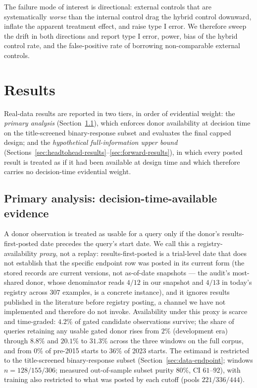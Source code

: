\documentclass[11pt]{article}
\begin{document}
The failure mode of interest is directional: external controls that are
systematically \emph{worse} than the internal control drag the hybrid control
downward, inflate the apparent treatment effect, and raise type I error. We
therefore sweep the drift in both directions and report type I error, power,
bias of the hybrid control rate, and the false-positive rate of borrowing
non-comparable external controls.

\section{Results}
\label{sec:results}

Real-data results are reported in two tiers, in order of evidential weight:
the \emph{primary analysis} (Section~\ref{sec:primary-results}), which
enforces donor availability at decision time on the title-screened binary-response
subset and evaluates the final capped design; and the \emph{hypothetical
full-information upper bound}
(Sections~\ref{sec:headtohead-results}--\ref{sec:forward-results}), in which
every posted result is treated as if it had been available at design time
and which therefore carries no decision-time evidential weight.

\subsection{Primary analysis: decision-time-available evidence}
\label{sec:primary-results}

A donor observation is treated as usable for a query only if the
donor's results-first-posted date precedes the query's start date. We call
this a registry-availability \emph{proxy}, not a replay: results-first-posted
is a trial-level date that does not establish that the specific endpoint row
was posted in its current form (the stored records are current versions, not
as-of-date snapshots --- the audit's most-shared donor, whose denominator
reads $4/12$ in our snapshot and $4/13$ in today's registry across $307$
examples, is a concrete instance), and it ignores results published in the
literature before registry posting, a channel we have not implemented and
therefore do not invoke. Availability under this proxy is scarce and
time-graded: $4.2\%$ of gated candidate observations survive; the share of
queries retaining any usable gated donor rises from $2\%$ (development era)
through $8.8\%$ and $20.1\%$ to $31.3\%$ across the three windows on the
full corpus, and from $0\%$ of pre-2015 starts to $36\%$ of 2023 starts.
The estimand is restricted to the title-screened binary-response subset
(Section~\ref{sec:data-endpoint}; windows $n = 128/155/306$; measured
out-of-sample subset purity $80\%$, CI $61$--$92$), with training
also restricted to what was posted by each cutoff (pools $221/336/444$).
\end{document}
